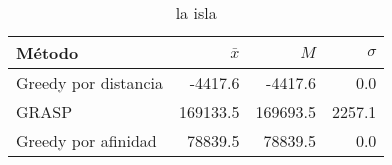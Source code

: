 \begin{table}[h!]
\centering
\begin{tabular}{|l|r|r|r|}
\hline
              Método &  $\bar{x}$ &      $M$ &  $\sigma$ \\
\hline
Greedy por distancia &    -4417.6 &  -4417.6 &       0.0 \\
               GRASP &   169133.5 & 169693.5 &    2257.1 \\
 Greedy por afinidad &    78839.5 &  78839.5 &       0.0 \\
\hline
\end{tabular}
\caption{la isla}
\label{la_isla}
\end{table}
